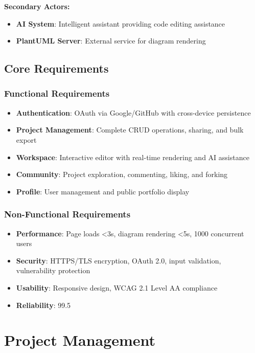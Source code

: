 \textbf{Secondary Actors:}
\begin{itemize}
    \item \textbf{AI System}: Intelligent assistant providing code editing assistance
    \item \textbf{PlantUML Server}: External service for diagram rendering
\end{itemize}

\subsection{Core Requirements}

\subsubsection{Functional Requirements}
\begin{itemize}
    \item \textbf{Authentication}: OAuth via Google/GitHub with cross-device persistence
    \item \textbf{Project Management}: Complete CRUD operations, sharing, and bulk export
    \item \textbf{Workspace}: Interactive editor with real-time rendering and AI assistance
    \item \textbf{Community}: Project exploration, commenting, liking, and forking
    \item \textbf{Profile}: User management and public portfolio display
\end{itemize}

\subsubsection{Non-Functional Requirements}
\begin{itemize}
    \item \textbf{Performance}: Page loads <3s, diagram rendering <5s, 1000 concurrent users
    \item \textbf{Security}: HTTPS/TLS encryption, OAuth 2.0, input validation, vulnerability protection
    \item \textbf{Usability}: Responsive design, WCAG 2.1 Level AA compliance
    \item \textbf{Reliability}: 99.5%
\end{itemize}

\section{Project Management}

